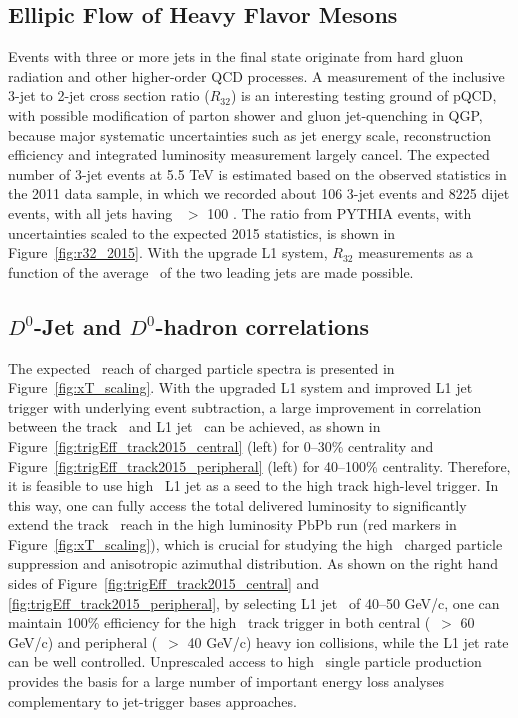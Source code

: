\subsection{Ellipic Flow of Heavy Flavor Mesons}

Events with three or more jets in the final state originate from hard gluon radiation and 
other higher-order QCD processes. A measurement of the inclusive 3-jet to 2-jet cross section 
ratio ($R_{32}$) is an interesting testing ground of pQCD, with possible modification of 
parton shower and gluon jet-quenching in QGP, because major systematic uncertainties such as 
jet energy scale, reconstruction efficiency and integrated luminosity measurement largely cancel. 
The expected number of 3-jet events at 5.5 TeV is estimated based on the observed statistics in the 2011 data sample, 
in which we recorded about 106 3-jet events and 8225 dijet events, with all jets having \pt\ $>$ 100 \GeVc.  
The ratio from PYTHIA events, with uncertainties scaled to the expected
2015 statistics, is shown in Figure~\ref{fig:r32_2015}. 
With the upgrade L1 system, $R_{32}$ measurements as a function of the
average \pt\ of the two leading jets are made possible.


\subsection{$D^0$-Jet and $D^0$-hadron correlations}

The expected \pt\ reach of charged particle spectra is presented in
Figure~\ref{fig:xT_scaling}.
With the upgraded L1 system and improved L1 jet trigger with underlying
event subtraction,
a large improvement in correlation between the track \pt\ and L1 jet \pt\ can be
achieved, as shown in
Figure~\ref{fig:trigEff_track2015_central} (left) for 0--30\% centrality and
Figure~\ref{fig:trigEff_track2015_peripheral} (left) for 40--100\%
centrality.
Therefore, it is feasible to use high \pt\ L1 jet as a seed to the high \pt
track high-level trigger.
In this way, one can fully access the total delivered luminosity to
significantly extend the track \pt\ reach in the high luminosity PbPb run 
(red markers in Figure~\ref{fig:xT_scaling}),
which is crucial for studying the high \pt\ charged particle suppression and
anisotropic azimuthal distribution.
As shown on the right hand sides of
Figure~\ref{fig:trigEff_track2015_central} and
\ref{fig:trigEff_track2015_peripheral},
by selecting L1 jet \pt\ of 40--50 GeV/c, one can maintain 100\%
efficiency for the high \pt\ track trigger
in both central (\pt\ $>$ 60 GeV/c) and peripheral (\pt\ $>$ 40 GeV/c) heavy ion collisions, 
while the L1 jet rate can be well controlled. Unprescaled access to high \pt\ 
single particle production provides the basis for a large number of 
important energy loss analyses complementary to jet-trigger bases approaches.


